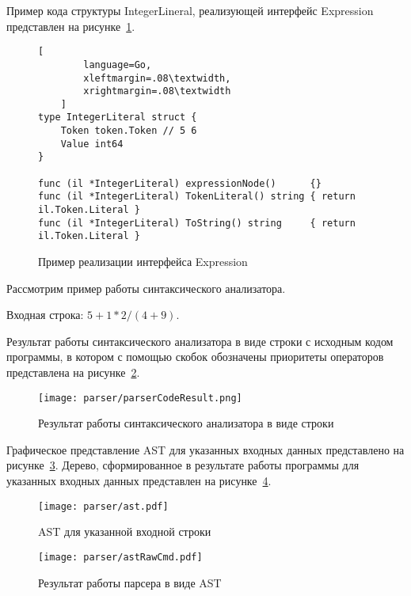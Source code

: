 Пример кода структуры IntegerLineral, реализующей интерфейс Expression представлен на рисунке~\ref{f:code_IExpressionExample}.

\begin{figure}[!htb]
	\centering
	\vspace{\toppaddingoffigure}
	\begin{lstlisting}[
        language=Go,
        xleftmargin=.08\textwidth,
        xrightmargin=.08\textwidth
    ]
type IntegerLiteral struct {
    Token token.Token // 5 6
    Value int64
}

func (il *IntegerLiteral) expressionNode()      {}
func (il *IntegerLiteral) TokenLiteral() string { return il.Token.Literal }
func (il *IntegerLiteral) ToString() string     { return il.Token.Literal }
\end{lstlisting}
	\caption{Пример реализации интерфейса Expression}
	\label{f:code_IExpressionExample}
\end{figure}

Рассмотрим пример работы синтаксического анализатора.

Входная строка: $5 + 1 * 2 / (4 + 9)$.

Результат работы синтаксического анализатора в виде строки с исходным кодом программы,
в котором с помощью скобок обозначены приоритеты операторов представлена на рисунке~\ref{f:parserCodeResult}.

\begin{figure}[ht]
	\centering
	\vspace{\toppaddingoffigure}
	\texttt{[image: parser/parserCodeResult.png]}
	\caption{Результат работы синтаксического анализатора в виде строки}
	\label{f:parserCodeResult}
\end{figure}

Графическое представление AST для указанных входных данных представлено на рисунке~\ref{f:ast}.
Дерево, сформированное в результате работы программы для указанных входных данных представлен на рисунке~\ref{f:astRawCmd}.

\begin{figure}[ht]
	\centering
	\vspace{\toppaddingoffigure}
	\texttt{[image: parser/ast.pdf]}
	\caption{AST для указанной входной строки}
	\label{f:ast}
\end{figure}

\clearpage

\begin{figure}[!htb]
	\centering
	\texttt{[image: parser/astRawCmd.pdf]}
	\caption{Результат работы парсера в виде AST}
	\label{f:astRawCmd}
\end{figure}

\clearpage